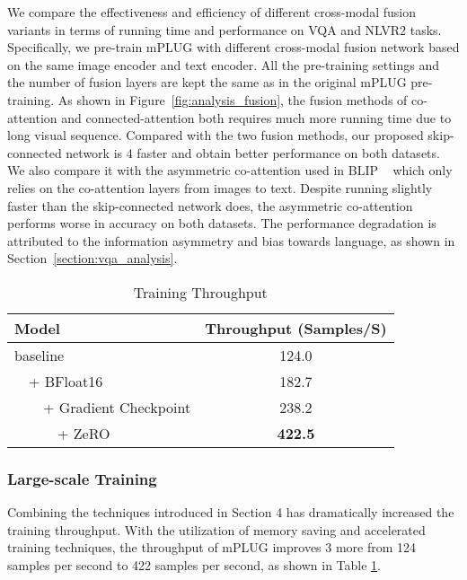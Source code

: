 \documentclass[11pt]{article}
\newcommand{\modelname}{mPLUG }
\begin{document}
We compare the effectiveness and efficiency of different cross-modal fusion variants in terms of running time and performance on VQA and NLVR2 tasks. Specifically, we pre-train \modelname with different cross-modal fusion network based on the same image encoder and text encoder. All the
pre-training settings and the number of fusion layers are kept the same as in the original \modelname pre-training. As shown in Figure~\ref{fig:analysis_fusion}, the fusion methods of co-attention and connected-attention both requires much more running time due to long visual sequence. Compared with the two fusion methods, our proposed skip-connected network is 4 faster and obtain better performance on both datasets. We also compare it with the asymmetric co-attention used in BLIP ~\cite{li2021align,li2022blip} which only relies on the co-attention layers from images to text. Despite running slightly faster than the skip-connected network does, the asymmetric co-attention performs worse in accuracy on both datasets. The performance degradation is attributed to the information asymmetry and bias towards language, as shown in Section~\ref{section:vqa_analysis}.



\begin{table}[t]
\setlength\tabcolsep{0pt}
\centering
\begin{tabular}{lc}
\toprule
Model & Throughput (Samples/S) \\
\midrule
baseline & 124.0 \\
\ \ + BFloat16 & 182.7 \\
\ \ \ \ + Gradient Checkpoint & 238.2 \\
\ \ \ \ \ \ + ZeRO & \textbf{422.5} \\
\bottomrule
\end{tabular}
\caption{Training Throughput}
\label{table:large-scale}
\end{table}


\subsubsection{Large-scale Training}
Combining the techniques introduced in Section 4 has dramatically increased the training throughput. With the utilization of memory saving and accelerated training techniques, the throughput of \modelname improves 3 more from 124 samples per second to 422 samples per second, as shown in Table \ref{table:large-scale}. 
\end{document}
